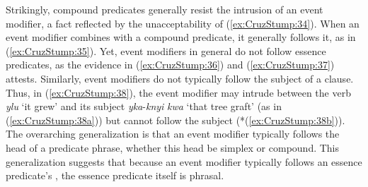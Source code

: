 \documentclass[output=paper]{langsci/langscibook}
\begin{document}
Strikingly, compound predicates generally resist the intrusion of an event modifier, a fact reflected by the unacceptability of (\ref{ex:CruzStump:34}).  When an event modifier combines with a compound predicate, it generally follows it, as in (\ref{ex:CruzStump:35}).  Yet, event modifiers in general do not follow essence predicates, as the evidence in (\ref{ex:CruzStump:36}) and (\ref{ex:CruzStump:37}) attests.  Similarly, event modifiers do not typically follow the subject of a clause.  Thus, in (\ref{ex:CruzStump:38}), the event modifier may intrude between the verb \textit{ylu} `it grew' and its subject \textit{yka}-\textit{knyi}  \textit{kwa} `that tree graft' (as in (\ref{ex:CruzStump:38a})) but cannot follow the subject (*(\ref{ex:CruzStump:38b})).  The overarching generalization is that an event modifier typically follows the head of a predicate phrase, whether this head be simplex or compound.  This generalization suggests that because an event modifier typically follows an essence predicate's , the essence predicate itself is phrasal. 
\end{document}
